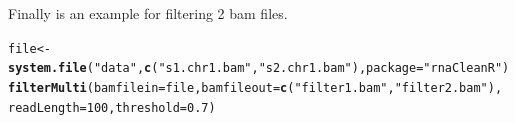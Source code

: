 \documentclass{article}\usepackage[]{graphicx}\usepackage[]{color}
\makeatletter
\newcommand{\hlnum}[1]{\textcolor[rgb]{0.686,0.059,0.569}{#1}}%
\newcommand{\hlstr}[1]{\textcolor[rgb]{0.192,0.494,0.8}{#1}}%
\newcommand{\hlstd}[1]{\textcolor[rgb]{0.345,0.345,0.345}{#1}}%
\newcommand{\hlkwb}[1]{\textcolor[rgb]{0.69,0.353,0.396}{#1}}%
\newcommand{\hlkwc}[1]{\textcolor[rgb]{0.333,0.667,0.333}{#1}}%
\newcommand{\hlkwd}[1]{\textcolor[rgb]{0.737,0.353,0.396}{\textbf{#1}}}%
\newenvironment{kframe}{%
 \def\at@end@of@kframe{}%
 \ifinner\ifhmode%
  \def\at@end@of@kframe{\end{minipage}}%
  \begin{minipage}{\columnwidth}%
 \fi\fi%
 \def\FrameCommand##1{\hskip\@totalleftmargin \hskip-\fboxsep
 \colorbox{shadecolor}{##1}\hskip-\fboxsep
     \hskip-\linewidth \hskip-\@totalleftmargin \hskip\columnwidth}%
 \MakeFramed {\advance\hsize-\width
   \@totalleftmargin\z@ \linewidth\hsize
   \@setminipage}}%
 {\par\unskip\endMakeFramed%
 \at@end@of@kframe}
\newenvironment{knitrout}{}{} %
\makeatother
\begin{document}
Finally is an example for filtering 2 bam files.

\begin{knitrout}
\color{fgcolor}\begin{kframe}
\begin{alltt}
\hlstd{file} \hlkwb{<-} \hlkwd{system.file}\hlstd{(}\hlstr{"data"}\hlstd{,}\hlkwd{c}\hlstd{(}\hlstr{"s1.chr1.bam"}\hlstd{,}\hlstr{"s2.chr1.bam"}\hlstd{),}\hlkwc{package} \hlstd{=} \hlstr{"rnaCleanR"}\hlstd{)}
\hlkwd{filterMulti}\hlstd{(}\hlkwc{bamfilein} \hlstd{= file,}\hlkwc{bamfileout} \hlstd{=} \hlkwd{c}\hlstd{(}\hlstr{"filter1.bam"}\hlstd{,}\hlstr{"filter2.bam"}\hlstd{),}
            \hlkwc{readLength} \hlstd{=} \hlnum{100}\hlstd{,} \hlkwc{threshold} \hlstd{=} \hlnum{0.7}\hlstd{)}
\end{alltt}
\end{kframe}
\end{knitrout}
\end{document}
